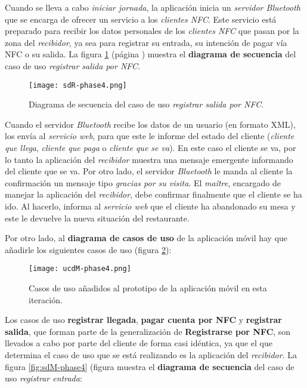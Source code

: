 Cuando se lleva a cabo \emph{iniciar jornada}, la aplicación inicia un
\emph{servidor Bluetooth} que se encarga de ofrecer un servicio a los
\emph{clientes \acs{NFC}}. Este servicio está preparado para recibir
los datos personales de los \emph{clientes \acs{NFC}} que pasan por la
zona del \emph{recibidor}, ya sea para registrar su entrada, su intención de
pagar vía \acs{NFC} o su salida. La figura \ref{fig:sdR-phase4} (página
\pageref{fig:sdR-phase4}) muestra el \textbf{diagrama de secuencia} del
caso de uso \emph{registrar salida por \acs{NFC}}.

  \begin{figure}[!h]
    \begin{center}
      \texttt{[image: sdR-phase4.png]}
      \caption{Diagrama de secuencia del caso de uso \emph{registrar salida
      por \acs{NFC}}.}
      \label{fig:sdR-phase4}
    \end{center}
  \end{figure}

Cuando el servidor \emph{Bluetooth} recibe los datos de un usuario (en formato
\acs{XML}), los envía al \emph{servicio web}, para que este le informe del
estado del cliente (\emph{cliente que llega}, \emph{cliente que paga} o
\emph{cliente que se va}). En este caso el cliente se va, por lo tanto la
aplicación del \emph{recibidor} muestra una mensaje emergente informando
del cliente que se va. Por otro lado, el servidor \emph{Bluetooth} le manda
al cliente la confirmación un mensaje tipo \emph{gracias por su visita}.
El \emph{maître}, encargado de manejar la aplicación del \emph{recibidor},
debe confirmar finalmente que el cliente se ha ido. Al hacerlo, informa
al \emph{servicio web} que el cliente ha abandonado su mesa y este le
devuelve la nueva situación del restaurante.

Por otro lado, al \textbf{diagrama de casos de uso} de la aplicación móvil
hay que añadirle los siguientes casos de uso (figura \ref{fig:ucdM-phase4}):

  \begin{figure}[!h]
    \begin{center}
      \texttt{[image: ucdM-phase4.png]}
      \caption{Casos de uso añadidos al prototipo de la aplicación
      móvil en esta iteración.}
      \label{fig:ucdM-phase4}
    \end{center}
  \end{figure}

Los casos de uso \textbf{registrar llegada}, \textbf{pagar cuenta por
\acs{NFC}} y \textbf{registrar salida}, que forman parte de la generalización
de \textbf{Registrarse por \acs{NFC}}, son llevados a cabo por parte del
cliente de forma casi idéntica, ya que el que determina el caso de uso que
se está realizando es la aplicación del \emph{recibidor}. La figura
\ref{fig:sdM-phase4} (figura \pageref{fig:sdM-phase4} muestra el
\textbf{diagrama de secuencia} del caso de uso \emph{registrar entrada}:

